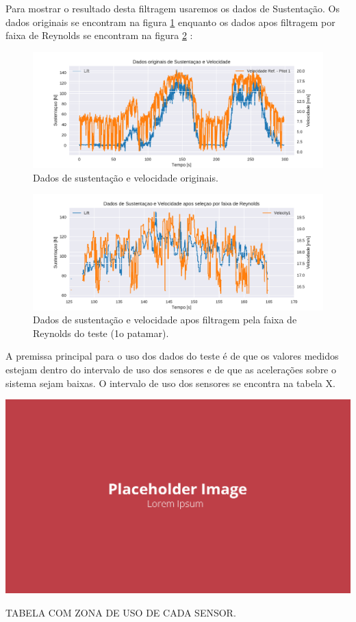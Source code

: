Para mostrar o resultado desta filtragem usaremos os dados de Sustentação. Os dados originais se encontram na figura \ref{fig:orig_lift_plot} enquanto os dados apos filtragem por faixa de Reynolds se encontram na figura \ref{fig:lift_reynolds_filter} :

\begin{figure}[!ht]
    \centering
    \includegraphics[width=.8\linewidth]{plots/orig_lift_plot.pdf}
    \caption{Dados de sustentação e velocidade originais\cite{autor}.}
    \label{fig:orig_lift_plot}
\end{figure}


\begin{figure}[!ht]
    \centering
    \includegraphics[width=.8\linewidth]{plots/reynolds_lift_plot.pdf}
    \caption{Dados de sustentação e velocidade apos filtragem pela faixa de Reynolds do teste (1o patamar)\cite{autor}.}
    \label{fig:lift_reynolds_filter}
\end{figure}

A premissa principal para o uso dos dados do teste é de que os valores medidos estejam dentro do intervalo de uso dos sensores e de que as acelerações sobre o sistema sejam baixas. O intervalo de uso dos sensores se encontra na tabela X.

\begin{table}[!ht]
    \centering
    \includegraphics[width=.8\linewidth]{figuras/outras/placeholder.png}
    \caption{TABELA COM ZONA DE USO DE CADA SENSOR\cite{autor}.}
    \label{fig:placeholder}
\end{table}

